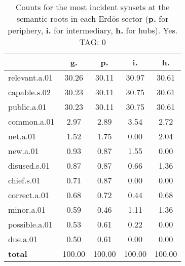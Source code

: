 \begin{table}[h!]
\begin{center}
\begin{tabular}{| l | c | c | c | c |}\hline
 & g. & p. & i. & h. \\\hline
relevant.a.01 & 30.26  & 30.11  & 30.97  & 30.61 \\\hline
capable.s.02 & 30.23  & 30.11  & 30.75  & 30.61 \\\hline
public.a.01 & 30.23  & 30.11  & 30.75  & 30.61 \\\hline
common.a.01 & 2.97  & 2.89  & 3.54  & 2.72 \\\hline
net.a.01 & 1.52  & 1.75  & 0.00  & 2.04 \\\hline
new.a.01 & 0.93  & 0.87  & 1.55  & 0.00 \\\hline
disused.s.01 & 0.87  & 0.87  & 0.66  & 1.36 \\\hline
chief.s.01 & 0.71  & 0.87  & 0.00  & 0.00 \\\hline
correct.a.01 & 0.68  & 0.72  & 0.44  & 0.68 \\\hline
minor.a.01 & 0.59  & 0.46  & 1.11  & 1.36 \\\hline
possible.a.01 & 0.53  & 0.61  & 0.22  & 0.00 \\\hline
due.a.01 & 0.50  & 0.61  & 0.00  & 0.00 \\\hline
{{\bf total}} & 100.00  & 100.00  & 100.00  & 100.00 \\\hline
\end{tabular}
\caption{Counts for the most incident synsets at the semantic roots in each Erd\"os sector ({\bf p.} for periphery, {\bf i.} for intermediary, {\bf h.} for hubs). Yes. TAG: 0}
\end{center}
\end{table}